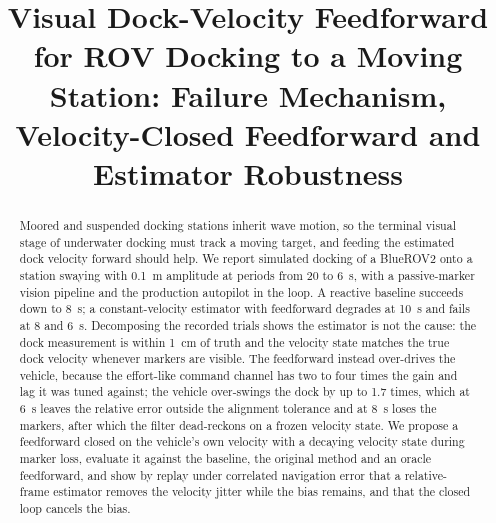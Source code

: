\documentclass[conference,a4paper]{IEEEtran}
\begin{document}
\title{Visual Dock-Velocity Feedforward for ROV Docking to a Moving Station: Failure Mechanism, Velocity-Closed Feedforward and Estimator Robustness}

\author{
\and
{}
}

\maketitle

\begin{abstract}
Moored and suspended docking stations inherit wave motion, so the terminal visual stage of underwater docking must track a moving target, and feeding the estimated dock velocity forward should help. We report simulated docking of a BlueROV2 onto a station swaying with 0.1~m amplitude at periods from 20 to 6~s, with a passive-marker vision pipeline and the production autopilot in the loop. A reactive baseline succeeds down to 8~s; a constant-velocity estimator with feedforward degrades at 10~s and fails at 8 and 6~s. Decomposing the recorded trials shows the estimator is not the cause: the dock measurement is within 1~cm of truth and the velocity state matches the true dock velocity whenever markers are visible. The feedforward instead over-drives the vehicle, because the effort-like command channel has two to four times the gain and lag it was tuned against; the vehicle over-swings the dock by up to 1.7 times, which at 6~s leaves the relative error outside the alignment tolerance and at 8~s loses the markers, after which the filter dead-reckons on a frozen velocity state. We propose a feedforward closed on the vehicle's own velocity with a decaying velocity state during marker loss, evaluate it against the baseline, the original method and an oracle feedforward, and show by replay under correlated navigation error that a relative-frame estimator removes the velocity jitter while the bias remains, and that the closed loop cancels the bias.
\end{abstract}
\end{document}
